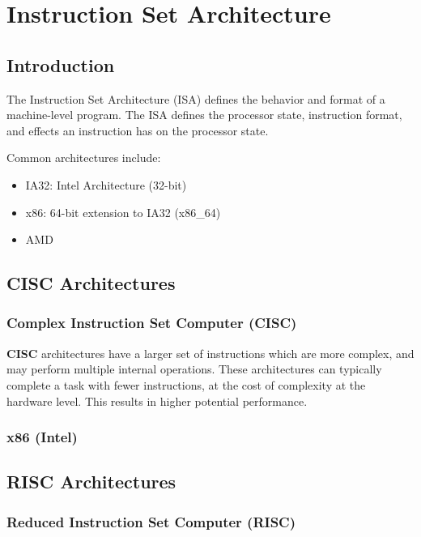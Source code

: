 \chapter{Instruction Set Architecture}

\section{Introduction}

The Instruction Set Architecture (ISA) defines the behavior and format of a machine-level program. The ISA defines the processor state, instruction format, and effects an instruction has on the processor state. 

Common architectures include:
\begin{itemize}
	\item IA32: Intel Architecture (32-bit)
	\item x86: 64-bit extension to IA32 (x86\_64)
	\item AMD
\end{itemize}

\section{CISC Architectures}

\subsection{Complex Instruction Set Computer (CISC)}

\textbf{CISC} architectures have a larger set of instructions which are more complex, and may perform multiple internal operations. These architectures can typically complete a task with fewer instructions, at the cost of complexity at the hardware level. This results in higher potential performance.

\subsection{x86 (Intel)}



\section{RISC Architectures}

\subsection{Reduced Instruction Set Computer (RISC)}

